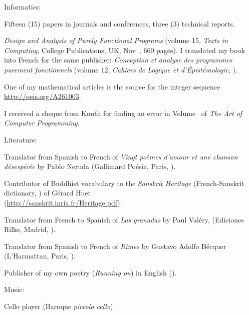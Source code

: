 \documentclass[a4paper,11pt]{article}
\begin{document}
\noindent Informatics:
\begin{itemize*}

  \item Fifteen (15) papers in journals and conferences, three (3)
    technical reports.

  \item \textit{Design and Analysis of Purely Functional Programs}
    (volume 15, \emph{Texts in Computing}, College Publications, UK,
    Nov~, 660 pages). I translated my book into
    French for the same publisher: \textit{Conception et analyse des
      programmes purement fonctionnels} (volume 12, \emph{Cahiers de
    Logique et d'Épistémologie}, ).

  \item One of my mathematical articles is the source for the integer
    sequence \url{http://oeis.org/A261003}.

  \item I received a cheque from Knuth for finding an error in
    Volume~ of \emph{The Art of Computer Programming}.

\end{itemize*}

\noindent Literature:
\begin{itemize*}

  \item Translator from Spanish to French of \textit{Vingt po\`emes
    d'amour et une chanson d\'esesp\'er\'ee} by Pablo Neruda
    (Gallimard Po\'esie, Paris, ).

  \item Contributor of Buddhist vocabulary to the \emph{Sanskrit
  Heritage} (French-Sanskrit dictionary, ) of
    G\'{e}rard Huet\\ (\url{http://sanskrit.inria.fr/Heritage.pdf}).

  \item Translator from French to Spanish of \emph{Las granadas} by
    Paul Val\'ery, (Ediciones Rilke, Madrid, ).

  \item Translator from Spanish to French of \textit{Rimes} by Gustavo
    Adolfo B\'ecquer (L'Harmattan, Paris, ).

  \item Publisher of my own poetry (\textit{Running on}) in English
    ().

\end{itemize*}

\noindent Music:
\begin{itemize*}

  \item Cello player (Baroque \emph{piccolo cello}).

\end{itemize*}


%
\nocite{*}
\end{document}

